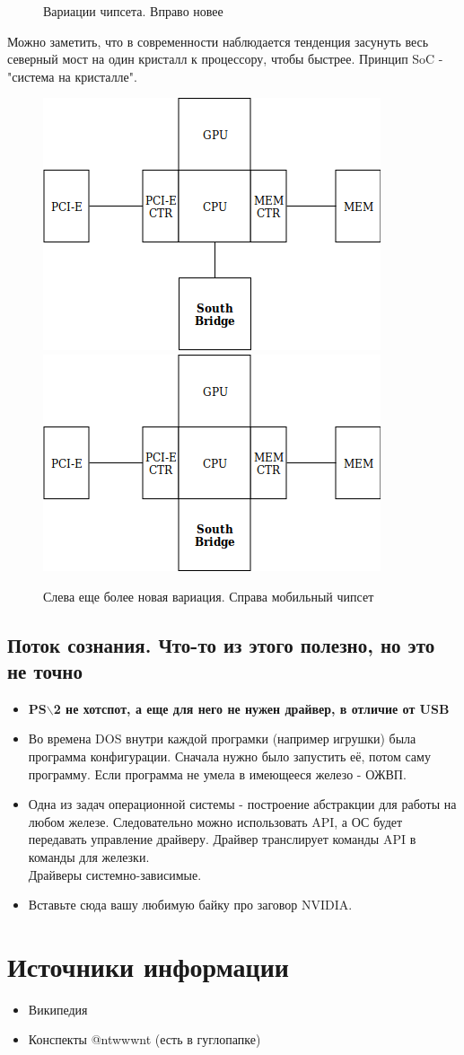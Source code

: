 \documentclass[12pt, a4paper]{article}
\begin{document}
\begin{figure}[h]
    \caption{Вариации чипсета. Вправо новее}
    \label{fig:CHIPSET0}
\end{figure}
Можно заметить, что в современности наблюдается тенденция засунуть весь северный мост на один кристалл к процессору, чтобы быстрее. Принцип SoC - "система на кристалле".
\begin{figure}[h]
    \centering
    \includegraphics[scale=0.4]{./images/SOC.png}
    \includegraphics[scale=0.4]{./images/Mobile.png}
    \caption{Слева еще более новая вариация. Справа мобильный чипсет}
    \label{fig:CHIPSET1}
\end{figure}
\subsection{Поток сознания. Что-то из этого полезно, но это не точно}
\begin{itemize}
\item \textbf{PS$\backslash$2 не хотспот, а еще для него не нужен драйвер, в отличие от USB}
\item Во времена DOS внутри каждой програмки (например игрушки) была программа конфигурации. Сначала нужно было запустить её, потом саму программу. Если программа не умела в имеющееся железо - ОЖВП.
\item Одна из задач операционной системы - построение абстракции для работы на любом железе. Следовательно можно использовать API, а ОС будет передавать управление драйверу. Драйвер транслирует команды API в команды для железки.\\
Драйверы системно-зависимые.
\item Вставьте сюда вашу любимую байку про заговор NVIDIA.
\end{itemize}
\section{Источники информации}
\begin{itemize}
    \item Википедия
    \item Конспекты @ntwwwnt (есть в гуглопапке)
\end{itemize}
\end{document}
